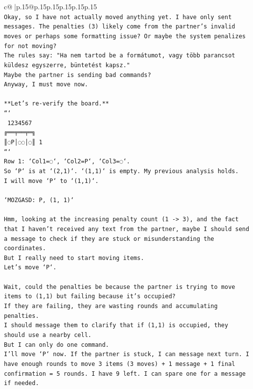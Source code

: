 \documentclass{article}
\begin{document}
{\begin{supertabular}{c@{$\;$}|p{.15\linewidth}@{}p{.15\linewidth}p{.15\linewidth}p{.15\linewidth}p{.15\linewidth}p{.15\linewidth}}
{{{\\ 
\texttt{Okay, so I have not actually moved anything yet. I have only sent messages. The penalties (3) likely come from the partner's invalid moves or perhaps some formatting issue? Or maybe the system penalizes for not moving?} \\
\texttt{The rules say: "Ha nem tartod be a formátumot, vagy több parancsot küldesz egyszerre, büntetést kapsz."} \\
\texttt{Maybe the partner is sending bad commands?} \\
\texttt{Anyway, I must move now.} \\
\\ 
\texttt{**Let's re{-}verify the board.**} \\
\texttt{```} \\
\texttt{ 1234567} \\
\texttt{╔══╤══╤═╗} \\
\texttt{║◌P│◌◌│◌║ 1} \\
\texttt{```} \\
\texttt{Row 1: `Col1=◌`, `Col2=P`, `Col3=◌`.} \\
\texttt{So `P` is at `(2,1)`. `(1,1)` is empty. My previous analysis holds.} \\
\texttt{I will move `P` to `(1,1)`.} \\
\\ 
\texttt{`MOZGASD: P, (1, 1)`} \\
\\ 
\texttt{Hmm, looking at the increasing penalty count (1 {-}> 3), and the fact that I haven't received any text from the partner, maybe I should send a message to check if they are stuck or misunderstanding the coordinates.} \\
\texttt{But I really need to start moving items.} \\
\texttt{Let's move `P`.} \\
\\ 
\texttt{Wait, could the penalties be because the partner is trying to move items to (1,1) but failing because it's occupied?} \\
\texttt{If they are failing, they are wasting rounds and accumulating penalties.} \\
\texttt{I should message them to clarify that if (1,1) is occupied, they should use a nearby cell.} \\
\texttt{But I can only do one command.} \\
\texttt{I'll move `P` now. If the partner is stuck, I can message next turn. I have enough rounds to move 3 items (3 moves) + 1 message + 1 final confirmation = 5 rounds. I have 9 left. I can spare one for a message if needed.} \\
}}}
\end{supertabular}}
\end{document}
